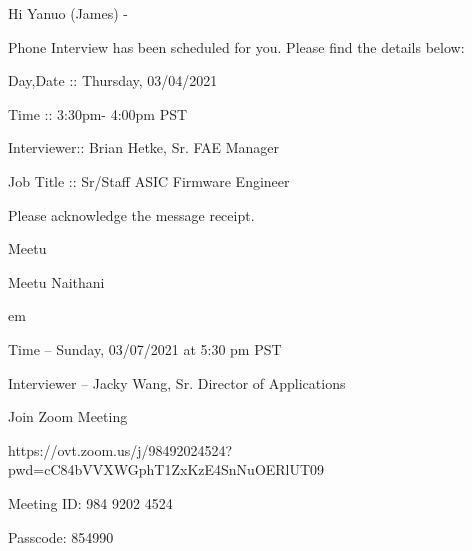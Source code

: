 \par \smallbreak       %
\par Hi Yanuo (James) -
\par Phone Interview has been scheduled for you. Please find the details below:
\par \smallbreak       %
\par Day,Date :: Thursday, 03/04/2021
\par Time :: 3:30pm- 4:00pm PST
\par Interviewer:: Brian Hetke, Sr. FAE Manager
\par Job Title :: Sr/Staff ASIC Firmware Engineer
\par \smallbreak       %
\par \smallbreak       %
\par Please acknowledge the message receipt.
\par \smallbreak       %
\par Meetu
\par \smallbreak       %
\par \smallbreak       %
\par Meetu Naithani

 em

\par Time – Sunday, 03/07/2021 at 5:30 pm PST
\par Interviewer – Jacky Wang, Sr. Director of Applications
\par Join Zoom Meeting
\par https://ovt.zoom.us/j/98492024524?pwd=cC84bVVXWGphT1ZxKzE4SnNuOERlUT09
\par Meeting ID: 984 9202 4524
\par Passcode: 854990


\bye
